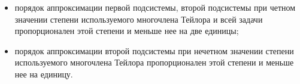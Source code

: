 {\begin{itemize}

\item[а)] порядок аппроксимации первой подсистемы, второй подсистемы при четном значении степени используемого многочлена Тейлора  и всей задачи пропорционален этой степени и меньше нее на две единицы;





\item[б)] порядок аппроксимации второй подсистемы при нечетном значении степени используемого многочлена Тейлора пропорционален этой степени и меньше нее на единицу.

\end{itemize}

}














